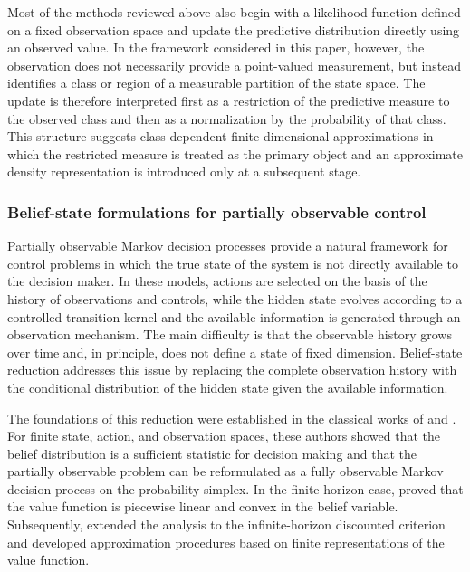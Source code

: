 \documentclass[10pt,twocolumn]{article}
\theoremstyle{remark}
\begin{document}
Most of the methods reviewed above also begin with a likelihood function defined on a fixed observation space and update the predictive distribution directly using an observed value. In the framework considered in this paper, however, the observation does not necessarily provide a point-valued measurement, but instead identifies a class or region of a measurable partition of the state space. The update is therefore interpreted first as a restriction of the predictive measure to the observed class and then as a normalization by the probability of that class. This structure suggests class-dependent finite-dimensional approximations in which the restricted measure is treated as the primary object and an approximate density representation is introduced only at a subsequent stage.


\subsubsection{Belief-state formulations for partially observable control}

Partially observable Markov decision processes provide a natural framework for control problems in which the true state of the system is not directly available to the decision maker. In these models, actions are selected on the basis of the history of observations and controls, while the hidden state evolves according to a controlled transition kernel and the available information is generated through an observation mechanism. The main difficulty is that the observable history grows over time and, in principle, does not define a state of fixed dimension. Belief-state reduction addresses this issue by replacing the complete observation history with the conditional distribution of the hidden state given the available information.

The foundations of this reduction were established in the classical works of \citet{SmallwoodSondik1973FiniteHorizonPOMDP} and \citet{Sondik1978InfiniteHorizonPOMDP}. For finite state, action, and observation spaces, these authors showed that the belief distribution is a sufficient statistic for decision making and that the partially observable problem can be reformulated as a fully observable Markov decision process on the probability simplex. In the finite-horizon case, \citet{SmallwoodSondik1973FiniteHorizonPOMDP} proved that the value function is piecewise linear and convex in the belief variable. Subsequently, \citet{Sondik1978InfiniteHorizonPOMDP} extended the analysis to the infinite-horizon discounted criterion and developed approximation procedures based on finite representations of the value function.
\end{document}
